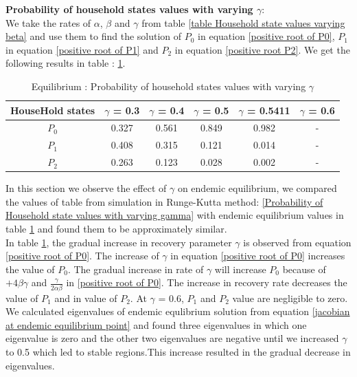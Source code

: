 \documentclass[paper=a4, fontsize=11pt, twoside, BCOR=12mm, parskip=full, listof=totoc]{scrreprt}
\begin{document}
{\textbf{Probability of household states values with varying $\gamma$}: \\
We take the rates of $\alpha$, $\beta$ and $\gamma$ from table \ref{table Household state values varying beta} and use them to find the solution of $P_0$ in equation \ref{positive root of P0}, $P_1$ in equation \ref{positive root of P1} and $P_2$ in equation \ref{positive root P2}. We get the following results in table : \ref{root Household state values varying gamma}. 

\begin{table}[H]
	\centering 
	\caption{Equilibrium : Probability of household states values with varying $\gamma$}
	\label{root Household state values varying gamma}
	\begin{tabular}{cccccc}
	\toprule
     HouseHold states & $\gamma$ = 0.3  & $\gamma$ = 0.4 & $\gamma$ = 0.5 & $\gamma$ = 0.5411 & $\gamma$ = 0.6 \\
     \midrule
	 $P_0$ & 0.327  & 0.561  & 0.849 & 0.982 & - \\ %
	 $P_1$ & 0.408  & 0.315  & 0.121 & 0.014 & - \\ %
	 $P_2$ & 0.263  & 0.123  & 0.028 & 0.002 & - \\ %
	\bottomrule
	\end{tabular}
\end{table}
In this section we observe the effect of $\gamma$ on endemic equilibrium, we compared the values of table from simulation in Runge-Kutta method: \ref{Probability of Household state values with varying gamma} with endemic equilibrium values in table \ref{root Household state values varying gamma} and found them to be approximately similar.\\
In table \ref{root Household state values varying gamma}, the gradual increase in recovery parameter $\gamma$ is observed from equation \ref{positive root of P0}. The increase of $\gamma$ in equation \ref{positive root of P0} increases the value of $P_0$. The gradual increase in rate of $\gamma$ will increase $P_0$ because of $+ 4\beta\gamma$ and $\frac{\gamma}{2\alpha\beta}$ in \ref{positive root of P0}. The increase in recovery rate decreases the value of $P_1$ and in value of $P_2$. At $\gamma$ = 0.6, $P_1$ and $P_2$ value are negligible to zero. 
We calculated eigenvalues of endemic equlibrium solution from equation \ref{jacobian at endemic equilibrium point} and found three eigenvalues in which one eigenvalue is zero and the other two eigenvalues are negative until we increased $\gamma$ to 0.5 which led to stable regions.This increase resulted in the gradual decrease in eigenvalues.\\
}
\end{document}
